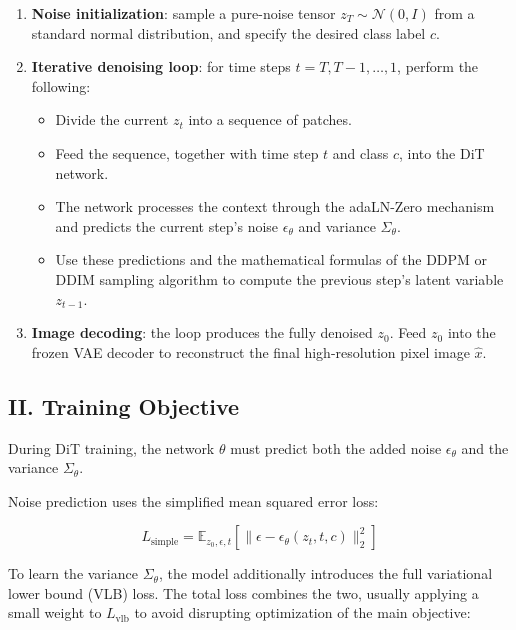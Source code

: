 \begin{enumerate}
\def\labelenumi{\arabic{enumi}.}
\tightlist
\item
  \textbf{Noise initialization}: sample a pure-noise tensor \(z_T\sim\mathcal{N}(0,I)\) from a standard normal distribution, and specify the desired class label \(c\).
\item
{}
  \textbf{Iterative denoising loop}: for time steps \(t=T,T-1,\ldots,1\), perform the following:

  \begin{itemize}
  \tightlist
  \item
    Divide the current \(z_t\) into a sequence of patches.
  \item
    Feed the sequence, together with time step \(t\) and class \(c\), into the DiT network.
  \item
    The network processes the context through the adaLN-Zero mechanism and predicts the current step's noise \(\epsilon_\theta\) and variance \(\Sigma_\theta\).
  \item
    Use these predictions and the mathematical formulas of the DDPM or DDIM sampling algorithm to compute the previous step's latent variable \(z_{t-1}\).
  \end{itemize}
\item
  \textbf{Image decoding}: the loop produces the fully denoised \(z_0\). Feed \(z_0\) into the frozen VAE decoder to reconstruct the final high-resolution pixel image \(\hat{x}\).
\end{enumerate}

\hypertarget{ii.-training-objective}{%
\subsection{II. Training Objective}\label{ii.-training-objective}}

During DiT training, the network \(\theta\) must predict both the added noise \(\epsilon_\theta\) and the variance \(\Sigma_\theta\).

Noise prediction uses the simplified mean squared error loss:

\[
L_{\mathrm{simple}}=\mathbb{E}_{z_0,\epsilon,t}\left[\lVert \epsilon-\epsilon_\theta(z_t,t,c)\rVert_2^2\right]
\]

To learn the variance \(\Sigma_\theta\), the model additionally introduces the full variational lower bound (VLB) loss. The total loss combines the two, usually applying a small weight to \(L_{\mathrm{vlb}}\) to avoid disrupting optimization of the main objective:

